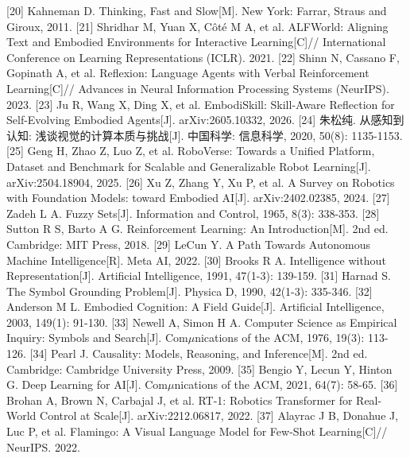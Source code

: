 \documentclass[12pt,a4paper]{article}
\begin{document}
[20] Kahneman D. Thinking, Fast and Slow[M]. New York: Farrar, Straus and Giroux, 2011.
[21] Shridhar M, Yuan X, Côté M A, et al. ALFWorld: Aligning Text and Embodied Environments for Interactive Learning[C]// International Conference on Learning Representations (ICLR). 2021.
[22] Shinn N, Cassano F, Gopinath A, et al. Reflexion: Language Agents with Verbal Reinforcement Learning[C]// Advances in Neural Information Processing Systems (NeurIPS). 2023.
[23] Ju R, Wang X, Ding X, et al. EmbodiSkill: Skill-Aware Reflection for Self-Evolving Embodied Agents[J]. arXiv:2605.10332, 2026.
[24] 朱松纯. 从感知到认知: 浅谈视觉的计算本质与挑战[J]. 中国科学: 信息科学, 2020, 50(8): 1135-1153.
[25] Geng H, Zhao Z, Luo Z, et al. RoboVerse: Towards a Unified Platform, Dataset and Benchmark for Scalable and Generalizable Robot Learning[J]. arXiv:2504.18904, 2025.
[26] Xu Z, Zhang Y, Xu P, et al. A Survey on Robotics with Foundation Models: toward Embodied AI[J]. arXiv:2402.02385, 2024.
[27] Zadeh L A. Fuzzy Sets[J]. Information and Control, 1965, 8(3): 338-353.
[28] Sutton R S, Barto A G. Reinforcement Learning: An Introduction[M]. 2nd ed. Cambridge: MIT Press, 2018.
[29] LeCun Y. A Path Towards Autonomous Machine Intelligence[R]. Meta AI, 2022.
[30] Brooks R A. Intelligence without Representation[J]. Artificial Intelligence, 1991, 47(1-3): 139-159.
[31] Harnad S. The Symbol Grounding Problem[J]. Physica D, 1990, 42(1-3): 335-346.
[32] Anderson M L. Embodied Cognition: A Field Guide[J]. Artificial Intelligence, 2003, 149(1): 91-130.
[33] Newell A, Simon H A. Computer Science as Empirical Inquiry: Symbols and Search[J]. Com$\mu$nications of the ACM, 1976, 19(3): 113-126.
[34] Pearl J. Causality: Models, Reasoning, and Inference[M]. 2nd ed. Cambridge: Cambridge University Press, 2009.
[35] Bengio Y, Lecun Y, Hinton G. Deep Learning for AI[J]. Com$\mu$nications of the ACM, 2021, 64(7): 58-65.
[36] Brohan A, Brown N, Carbajal J, et al. RT-1: Robotics Transformer for Real-World Control at Scale[J]. arXiv:2212.06817, 2022.
[37] Alayrac J B, Donahue J, Luc P, et al. Flamingo: A Visual Language Model for Few-Shot Learning[C]// NeurIPS. 2022.
\end{document}
